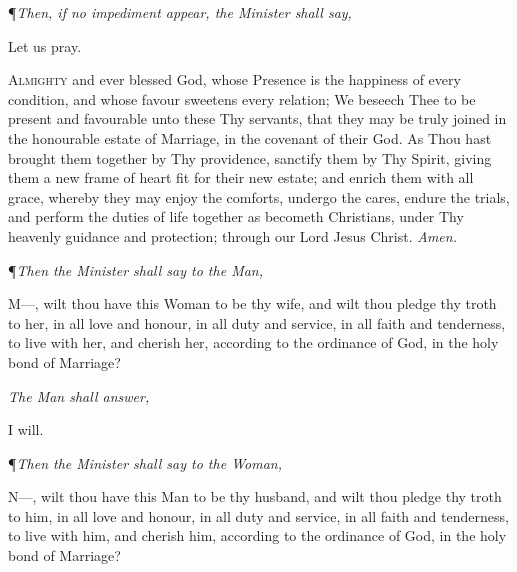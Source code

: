 {\centering\P\textit{Then, if no impediment appear, the Minister shall say,}\par}
\vspace{1ex}

{\centering Let us pray. \par}
\vspace{1ex}

\lettrine[lines=1]{A}{lmighty} and ever blessed God, whose Presence is
the happiness of every condition, and whose favour
sweetens every relation; We beseech Thee to be present
and favourable unto these Thy servants, that they may be
truly joined in the honourable estate of Marriage, in the covenant of their God. As Thou hast brought them together
by Thy providence, sanctify them by Thy Spirit, giving
them a new frame of heart fit for their new estate; and enrich them with all grace, whereby they may enjoy the
comforts, undergo the cares, endure the trials, and perform the duties of life together as becometh Christians,
under Thy heavenly guidance and protection; through our
Lord Jesus Christ.
\textit{Amen.} \\

{\centering\P\textit{Then the Minister shall say to the Man,}\par}
\vspace{1ex}

\lettrine{M}{---,} wilt thou have this Woman to be thy wife, and
wilt thou pledge thy troth to her, in all love and
honour, in all duty and service, in all faith and tenderness,
to live with her, and cherish her, according to the ordinance
of God, in the holy bond of Marriage? \\

{\centering\textit{The Man shall answer,}\par}
\vspace{1ex}

{\centering I will. \par}
\vspace{1ex}

{\centering\P\textit{Then the Minister shall say to the Woman,}\par}
\vspace{1ex}

\lettrine{N}{---,} wilt thou have this Man to be thy husband, and
wilt thou pledge thy troth to him, in all love and
honour, in all duty and service, in all faith and tenderness,
to live with him, and cherish him, according to the ordinance of God, in the holy bond of Marriage? \\

